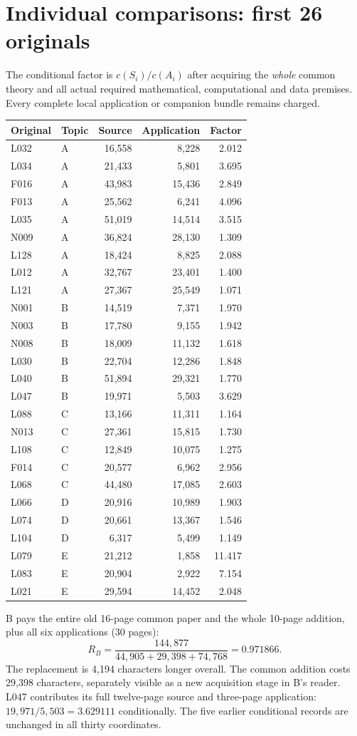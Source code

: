 \documentclass[11pt,a4paper]{article}
\begin{document}
\section*{Individual comparisons: first 26 originals}
The conditional factor is $c(S_i)/c(A_i)$ after acquiring the \emph{whole} common theory and all actual required mathematical, computational and data premises. Every complete local application or companion bundle remains charged.
\begin{center}\small\begin{tabular}{llrrr}\toprule
Original & Topic & Source & Application & Factor\\\midrule
L032 & A & 16,558 & 8,228 & 2.012 \\
L034 & A & 21,433 & 5,801 & 3.695 \\
F016 & A & 43,983 & 15,436 & 2.849 \\
F013 & A & 25,562 & 6,241 & 4.096 \\
L035 & A & 51,019 & 14,514 & 3.515 \\
N009 & A & 36,824 & 28,130 & 1.309 \\
L128 & A & 18,424 & 8,825 & 2.088 \\
L012 & A & 32,767 & 23,401 & 1.400 \\
L121 & A & 27,367 & 25,549 & 1.071 \\
N001 & B & 14,519 & 7,371 & 1.970 \\
N003 & B & 17,780 & 9,155 & 1.942 \\
N008 & B & 18,009 & 11,132 & 1.618 \\
L030 & B & 22,704 & 12,286 & 1.848 \\
L040 & B & 51,894 & 29,321 & 1.770 \\
L047 & B & 19,971 & 5,503 & 3.629 \\
L088 & C & 13,166 & 11,311 & 1.164 \\
N013 & C & 27,361 & 15,815 & 1.730 \\
L108 & C & 12,849 & 10,075 & 1.275 \\
F014 & C & 20,577 & 6,962 & 2.956 \\
L068 & C & 44,480 & 17,085 & 2.603 \\
L066 & D & 20,916 & 10,989 & 1.903 \\
L074 & D & 20,661 & 13,367 & 1.546 \\
L104 & D & 6,317 & 5,499 & 1.149 \\
L079 & E & 21,212 & 1,858 & 11.417 \\
L083 & E & 20,904 & 2,922 & 7.154 \\
L021 & E & 29,594 & 14,452 & 2.048 \\\bottomrule\end{tabular}\end{center}
B pays the entire old 16-page common paper and the whole 10-page addition, plus all six applications (30 pages):
\[R_B=\frac{144,877}{44,905+29,398+74,768}=0.971866.\]
The replacement is 4,194 characters longer overall. The common addition costs 29,398 characters, separately visible as a new acquisition stage in B's reader. L047 contributes its full twelve-page source and three-page application: $19,971/5,503=3.629111$ conditionally. The five earlier conditional records are unchanged in all thirty coordinates.
\newpage
\end{document}
